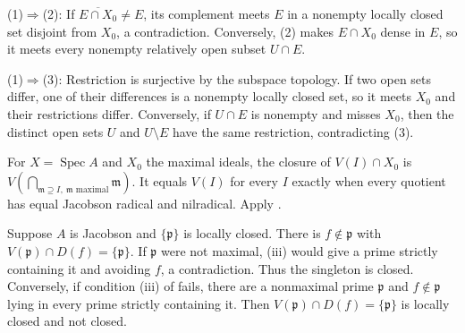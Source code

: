 (1)$\Rightarrow$(2): If $\overline{E\cap X_0}\neq E$, its complement meets $E$ in a nonempty locally closed set disjoint from $X_0$, a contradiction. Conversely, (2) makes $E\cap X_0$ dense in $E$, so it meets every nonempty relatively open subset $U\cap E$.

(1)$\Rightarrow$(3): Restriction is surjective by the subspace topology. If two open sets differ, one of their differences is a nonempty locally closed set, so it meets $X_0$ and their restrictions differ. Conversely, if $U\cap E$ is nonempty and misses $X_0$, then the distinct open sets $U$ and $U\setminus E$ have the same restriction, contradicting (3).

For $X=\operatorname{Spec}A$ and $X_0$ the maximal ideals, the closure of $V(I)\cap X_0$ is $V(\bigcap_{\mathfrak{m}\supseteq I,\ \mathfrak{m}\text{ maximal}}\mathfrak{m})$. It equals $V(I)$ for every $I$ exactly when every quotient has equal Jacobson radical and nilradical. Apply .

Suppose $A$ is Jacobson and $\{\mathfrak{p}\}$ is locally closed. There is $f\notin\mathfrak{p}$ with $V(\mathfrak{p})\cap D(f)=\{\mathfrak{p}\}$. If $\mathfrak{p}$ were not maximal, (iii) would give a prime strictly containing it and avoiding $f$, a contradiction. Thus the singleton is closed. Conversely, if condition (iii) of  fails, there are a nonmaximal prime $\mathfrak{p}$ and $f\notin\mathfrak{p}$ lying in every prime strictly containing it. Then $V(\mathfrak{p})\cap D(f)=\{\mathfrak{p}\}$ is locally closed and not closed.
